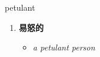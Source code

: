 
\begin{frame}
{\huge petulant}
\begin{center}
\begin{enumerate}\Large
  \item \textbf{易怒的}
  \begin{itemize}
    \item \em{\Large{a petulant person}}
  \end{itemize}
\end{enumerate}
\end{center}
\end{frame}

